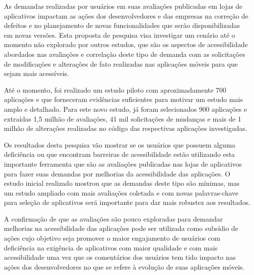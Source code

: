 As demandas realizadas por usuários em suas avaliações publicadas em lojas de aplicativos impactam as ações dos desenvolvedores e das empresas na correção de defeitos e no planejamento de novas funcionalidades que serão disponibilizadas em novas versões. Esta proposta de pesquisa visa investigar um cenário até o momento não explorado por outros estudos, que são os aspectos de acessibilidade abordados nas avaliações e correlação deste tipo de demanda com as solicitações de modificações e alterações de fato realizadas nas aplicações móveis para que sejam mais acessíveis.

Até o momento, foi realizado um estudo piloto com aproximadamente 700 aplicações e que forneceram evidências suficientes para motivar um estudo mais amplo e detalhado. Para este novo estudo, já foram selecionados 900 aplicações e extraídas 1,5 milhão de avaliações, 41 mil solicitações de mudanças e mais de 1 milhão de alterações realizadas no código das respectivas aplicações investigadas. 

Os resultados desta pesquisa vão mostrar se os usuários que possuem alguma deficiência ou que encontram barreiras de acessibilidade estão utilizando esta importante ferramenta que são as avaliações publicadas nas lojas de aplicativos para fazer suas demandas por melhorias da acessibilidade das aplicações. O estudo inicial realizado mostrou que as demandas deste tipo são mínimas, mas um estudo ampliado com mais avaliações coletada e com novas palavras-chave para seleção de aplicativos será importante para dar mais robustez aos resultados. 

A confirmação de que as avaliações são pouco exploradas para demandar melhorias na acessibilidade das aplicações pode ser utilizada como subsídio de ações cujo objetivo seja promover o maior engajamento de usuários com deficiência na exigência de aplicativos com maior qualidade e com mais acessibilidade uma vez que os comentários dos usuários tem tido impacto nas ações dos desenvolvedores no que se refere à evolução de suas aplicações móveis. 



